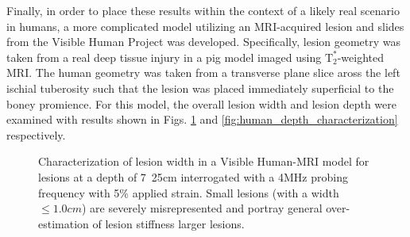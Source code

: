 			Finally, in order to place these results within the context of a likely real scenario in humans, a more complicated model utilizing an MRI-acquired lesion and slides from the Visible Human Project \cite{visiblehuman} was developed. Specifically, lesion geometry was taken from a real deep tissue injury in a pig model imaged using $\mathrm{T}_2^*$-weighted MRI. The human geometry was taken from a transverse plane slice aross the left ischial tuberosity such that the lesion was placed immediately superficial to the boney promience. For this model, the overall lesion width and lesion depth were examined with results shown in Figs. \ref{fig:human_size_characterization} and \ref{fig:human_depth_characterization} respectively.

			\begin{figure}[!t]
				\centering
				\caption[Lesion width characterization in a Visible Human-MRI model]{Characterization of lesion width in a Visible Human-MRI model for lesions at a depth of \unit{7.25}{cm} interrogated with a \unit{4}{MHz} probing frequency with \unit{5}{\%} applied strain. Small lesions (with a width $\leq \unit{1.0}{cm}$) are severely misrepresented and portray general over-estimation of lesion stiffness larger lesions.}
				\label{fig:human_size_characterization}
			\end{figure}

